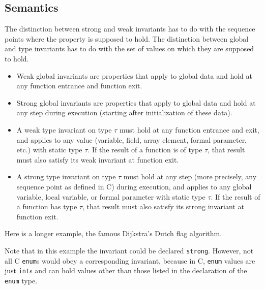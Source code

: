 \subsection{Semantics}

The distinction between strong and weak invariants has to do with the
sequence points where the property is supposed to hold. The distinction
between global and type invariants has to do with the set of values on
which they are supposed to hold.

\begin{itemize}
\item Weak global invariants are properties that apply to global
  data and hold at any function entrance and function exit.

\item Strong global invariants are properties that apply to global
  data and hold at any step during execution (starting after
  initialization of these data).

\item A weak type invariant on type $\tau$ must hold at any function
  entrance and exit, and applies to any value (variable, field, array element, formal
  parameter, etc.) with static type $\tau$. If the result of a
  function is of type $\tau$, that result must also satisfy its
  weak invariant at function exit.

\item A strong type invariant on type $\tau$ must hold at any step
(more precisely, any sequence point as defined in C)
  during execution, and applies to any global variable, local
  variable, or formal parameter
  with static type $\tau$. If the
  result of a function has type $\tau$, that result must also
  satisfy its strong invariant at function exit.

\end{itemize}


\begin{example}

\end{example}

\begin{example}
  Here is a longer example, the famous Dijkstra's Dutch flag algorithm.\\
\end{example}
Note that in this example the invariant could be declared \lstinline|strong|. However, not all C \lstinline|enum|s would
obey a corresponding invariant, because in C, \lstinline|enum| values are just \lstinline|int|s and can hold values other
than those listed in the declaration of the \lstinline|enum| type.

